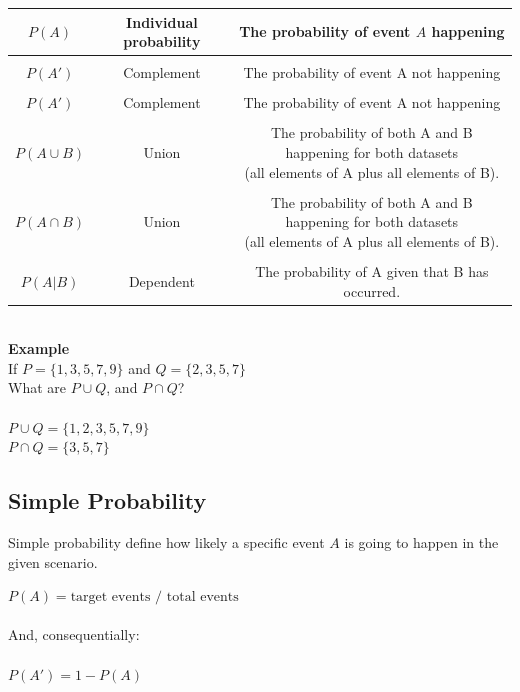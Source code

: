\documentclass{article}
\begin{document}
\begin{center}
\begin{tabular}{|c|c|c|}
\hline
$P(A)$ & Individual probability & The probability of event $A$ happening \\ \hline
&&\\[-1em]
$P(A')$ & Complement & The probability of event A not happening \\ \hline
&&\\[-1em]
$P(A')$ & Complement & The probability of event A not happening \\ \hline
&&\\[-1em]
$P(A \cup B)$ & Union & \makecell{The probability of both A and B happening for both datasets \\ (all elements of A plus all elements of B).} \\ \hline
&&\\[-1em]
$P(A \cap B)$ & Union & \makecell{The probability of both A and B happening for both datasets \\ (all elements of A plus all elements of B).} \\ \hline
&&\\[-1em]
$P(A | B)$ & Dependent & The probability of A given that B has occurred. \\
\hline
\end{tabular}
\end{center}

\mbox{} \\

\textbf{Example}\\ 
If $P = \{1,3,5,7,9\}$ and $Q = \{2,3,5,7\}$ \\
What are $P \cup Q$, and $P \cap  Q$? \\ 
\mbox{} \\
$P \cup Q = \{1,2,3,5,7,9\}$ \\ 
$P \cap Q = \{3,5,7\}$ \\

\subsection{Simple Probability}
Simple probability define how likely a specific event $A$ is going to happen in the given scenario. 

$P(A) = \text{target events / total events}$ \\
\mbox{} \\
And, consequentially: \\
\mbox{} \\
$P(A') = 1 - P(A)$
\end{document}
